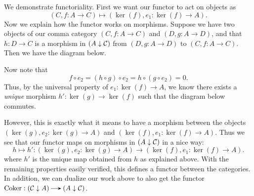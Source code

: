 \begin{prf}
    We demonstrate functoriality. First we want our functor 
    to act on objects as 
    \[
       (C, f: A \to C) \mapsto (\ker(f), e_1: \ker(f) \to A). 
    \]
    Now we explain how the functor works on morphisms. 
    Suppose we have two objects of our 
    comma category $(C, f: A \to C)$ and $(D, g: A \to D)$, and that $h: D \to C$
    is a morphism in $(A \downarrow \mathcal{C})$ 
    from $(D, g: A \to D)$ to $(C, f: A \to C)$. Then we have the diagram below.
    \begin{center}
    \end{center}
    Now note that 
    \[
        f \circ e_2 = (h \circ g) \circ e_2 = h \circ (g \circ e_2) = 0.
    \]
    Thus, by the universal property of $e_1: \ker(f) \to A$, we know there 
    exists a \emph{unique} morphism $h': \ker(g) \to \ker(f)$ such that the diagram 
    below commutes.
    \begin{center}
    \end{center}
    
    However, this is exactly what it means to have a morphism between the objects 
    $(\ker(g), e_2: \ker(g) \to A)$ and $(\ker(f), e_1: \ker(f) \to A)$. 
    Thus we see that our functor maps on morphisms in $(A \downarrow \mathcal{C})$ in a nice 
    way:  
    \[
        h  \mapsto 
        h':
        (\ker(g), e_2: \ker(g) \to A) 
        \to 
        (\ker(f), e_1: \ker(f) \to A).
    \]
    where $h'$ is the unique map obtained from $h$ as explained above. 
    With the remaining properties easily verified, this defines a functor between the categories. 
    In addition, we can dualize our work above to also get the functor 
    $\coker: (\cc \downarrow A) \to (A \downarrow \cc)$. 


\end{prf}

